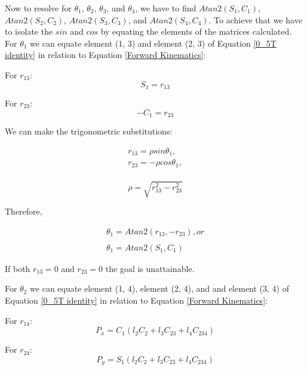 \documentclass[transmag]{IEEEtran}
\begin{document}
Now to resolve for $\theta_1$, $\theta_2$, $\theta_3$, and $\theta_4$, we have to find $Atan2(S_1, C_1)$, $Atan2(S_2, C_2)$,  $Atan2(S_3, C_3)$, and $Atan2(S_4, C_4)$. To achieve that we have to isolate the $sin$ and $cos$ by equating the elements of the matrices calculated. For $\theta_1$ we can equate element (1, 3) and element (2, 3) of Equation \ref{0_5T identity} in relation to Equation \ref{Forward Kinematics}:


For $r_{13}$:
\begin{equation}
S_1 = r_{13}
\label{1-3}
\end{equation}

For $r_{23}$:
\begin{equation}
-C_1 = r_{23}
\label{2-3}
\end{equation}

We can make the trigonometric substitutions:

\begin{equation}
\begin{matrix}
r_{13} = \rho sin \theta_1, \\
r_{23} = -\rho cos \theta_1, \\
\end{matrix}
\end{equation}

\begin{equation}
\rho = \sqrt{r_{13}^2 - r_{23}^2} 
\end{equation}


Therefore,



\begin{equation}
\begin{matrix}
\theta_1 = Atan2(r_{13}, - r_{23}), or \\
\\
\theta_1 = Atan2(S_1, C_1)
\end{matrix}
\label{2-3}
\end{equation}


If both $r_{13} = 0$ and $r_{23} = 0$ the goal is unattainable.

For $\theta_2$ we can equate element (1, 4), element (2, 4), and and element (3, 4) of Equation \ref{0_5T identity} in relation to Equation \ref{Forward Kinematics}:

For $r_{14}$:
\begin{equation}
P_x = C_1(l_2 C_2 + l_3 C_{23} + l_4 C_{234})
\label{1-3}
\end{equation}

For $r_{24}$:
\begin{equation}
P_y = S_1 (l_2 C_2 + l_3 C_{23} + l_4 C_{234})
\label{2-3}
\end{equation}
\end{document}
